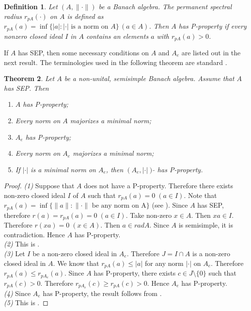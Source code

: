 \documentclass{amsart}
\theoremstyle{plain}
\newtheorem{defn}{Definition}[section]
\newtheorem{thm}[defn]{Theorem}
\numberwithin{equation}{section}
\begin{document}
\begin{defn}
Let $(A, \|\cdot\|)$ be a Banach algebra. The \emph{permanent spectral radius} $r_{pA}(\cdot)$ on $A$ is defined as $r_{pA}(a) = \inf\{|a|: |\cdot| \text{ is a norm on } A\} \, (a \in A)$. Then $A$ has \emph{P-property} if every nonzero closed ideal $I$ in $A$ contains an elements $a$ with $r_{pA}(a) > 0$.
\end{defn}

If $A$ has SEP, then some necessary conditions on $A$ and $A_e$ are listed out in the next result. The terminologies used in the following theorem are standard \cite{Me:92}.

\begin{thm}\label{mayer}
Let $A$ be a non-unital, semisimple Banach algebra. Assume that $A$ has SEP. Then
\begin{enumerate}
\item $A$ has P-property;
\item Every norm on $A$ majorizes a minimal norm;
\item $A_e$ has P-property;
\item Every norm on $A_e$ majorizes a minimal norm;
\item If $|\cdot|$ is a minimal norm on $A_e$, then $(A_e, |\cdot|) \, \widetilde{}$ has P-property.
\end{enumerate}
\end{thm}

\begin{proof}
\emph{(1)} Suppose that $A$ does not have a P-property. Therefore there exists non-zero closed ideal $I$ of $A$ such that $r_{pA}(a) = 0 \; (a \in I)$. Note that $r_{pA}(a) = \inf\{\|a\|: \|\cdot\| \text{ be any norm on A}\}$ (see \cite[Page 79]{Me:92}). Since $A$ has SEP, therefore $r(a) = r_{pA}(a) = 0 \; (a \in I)$. Take non-zero $x \in A$. Then $xa \in I$. Therefore $r(xa) = 0 \; (x \in A)$. Then $a \in radA$. Since $A$ is semisimple, it is contradiction. Hence $A$ has P-property.\\
\emph{(2)} This is \cite[Theorem 2(C)]{Me:92}.\\
\emph{(3)} Let $I$ be a non-zero closed ideal in $A_e$. Therefore $J = I \cap A$ is a non-zero closed ideal in $A$. We know that $r_{pA}(a) \leq |a|$ for any norm $|\cdot|$ on $A_e$. Therefore $r_{pA}(a) \leq r_{pA_e}(a)$. Since $A$ has P-property, there exists $c \in J \setminus \{0\}$ such that $r_{pA}(c) >0$. Therefore $r_{pA_e}(c) \geq r_{pA}(c) >0$. Hence $A_e$ has P-property.\\
\emph{(4)} Since $A_e$ has P-property, the result follows from \cite[Theorem 2(C)]{Me:92}.\\
\emph{(5)} This is \cite[Theorem 2(G)]{Me:92}.
\end{proof}
\end{document}
